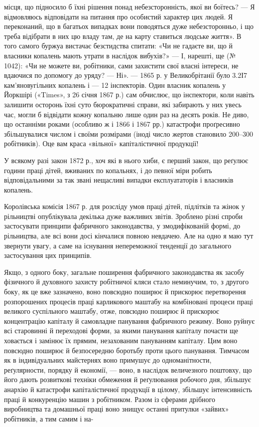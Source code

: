 \parcont{}  %
місця, що підносило б їхні рішення понад небезсторонність, якої
ви боїтесь? — Я відмовляюсь відповідати на питання про особистий
характер цих людей. Я переконаний, що в багатьох випадках
вони поводяться дуже небезсторонньо, і що треба відібрати
в них цю владу там, де на карту ставиться людське життя».
В того самого буржуа вистачає безстидства спитати: «Чи не гадаєте
ви, що й власники копалень мають утрати в наслідок вибухів?»
— І, нарешті, ще (№ 1042): «Чи не можете ви, робітники,
сами захистити свої власні інтереси, не вдаючися по допомогу
до уряду? — Ні». — 1865 р. у Великобрітанії було 3.2І7 кам’яновугільних
копалень і — 12 інспекторів. Один власник копалень
у Йоркшірі («Times», з 26 січня 1867 р.) сам обчислює, що
інспектори, коли навіть залишити осторонь їхні суто бюрократичні
справи, які забирають у них увесь час, могли б відвідати
кожну копальню лише один раз на десять років. Не диво, що
останніми роками (особливо ж і 1866 і 1867 рр.) катастрофи проґресивно
збільшувалися числом і своїми розмірами (іноді число
жертов становило 200--300 робітників). Оце вам краса «вільної»
капіталістичної продукції!

У всякому разі закон 1872 р., хоч які в нього хиби, є перший
закон, що реґулює години праці дітей, вживаних по копальнях,
і до певної міри робить відповідальними за так звані нещасливі
випадки експлуататорів і власників копалень.

Королівська комісія 1867 р. для розсліду умов праці дітей,
підлітків та жінок у рільництві опублікувала декілька дуже
важливих звітів. Зроблено різні спроби застосувати принципи
фабричного законодавства, у змодифікованій формі, до рільництва,
але всі вони досі кінчалися повною невдачею. Але на одно
я маю тут звернути увагу, а саме на існування непереможної
тенденції до загального застосування цих принципів.

Якщо, з одного боку, загальне поширення фабричного законодавства
як засобу фізичного й духовного захисту робітничої
кляси стало неминучим, то, з другого боку, як це вже зазначено,
воно повсюдно поширює й прискорює перетворення розпорошених
процесів праці карликового маштабу на комбіновані процеси
праці великого суспільного маштабу, отже, повсюдно поширює
й прискорює концентрацію капіталу й самовладне панування
фабричного режиму. Воно руйнує всі старовинні й переходові
форми, за якими панування капіталу почасти ще ховається і
замінює їх прямим, незахованим пануванням капіталу. Цим
воно повсюдно поширює й безпосередню боротьбу проти цього
панування. Тимчасом як в індивідуальних майстернях воно примушує
до одноманітности, реґулярности, порядку й економії, —
воно, в наслідок величезного поштовху, що його дають розвиткові
техніки обмеження й реґулювання робочого дня, збільшує
анархію й катастрофи капіталістичної продукції в цілому, збільшує
інтенсивність праці й конкуренцію машин з робітником. Разом
із сферами дрібного виробництва та домашньої праці воно знищує
останні притулки «зайвих» робітників, а тим самим і на-
\parbreak{}  %
